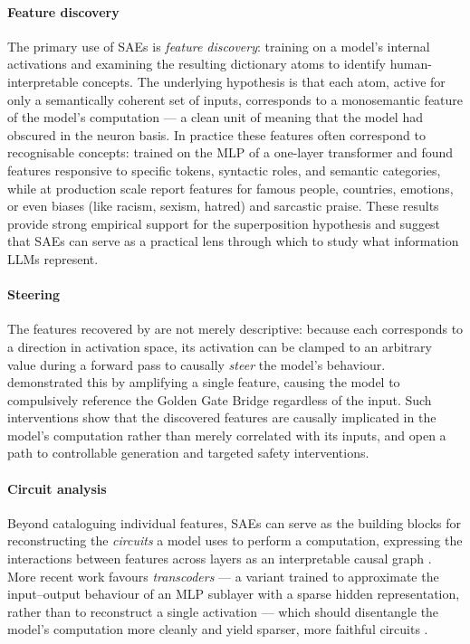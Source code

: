     \paragraph{Feature discovery} The primary use of \acp{SAE} is
    \textit{feature discovery}: training  on a model's internal
    activations and examining the resulting dictionary atoms to identify
    human-interpretable concepts. The underlying hypothesis is that each atom,
    active for only a semantically coherent set of inputs, corresponds to a
    monosemantic feature of the model's computation --- a clean unit of meaning
    that the model had obscured in the neuron basis. In practice these features
    often correspond to recognisable concepts:
    \citet{brickenMonosemanticityDecomposingLanguage2023} trained  on
    the \ac{MLP} of a one-layer transformer and found features responsive to
    specific tokens, syntactic roles, and semantic categories, while at
    production scale \citet{templetonScalingMonosemanticityExtracting} report
    features for famous people, countries, emotions, or even biases (like
    racism, sexism, hatred) and sarcastic praise. These results provide strong
    empirical support for the superposition hypothesis and suggest that
    \acp{SAE} can serve as a practical lens through which to study what
    information \acp{LLM} represent.

    \paragraph{Steering} The features recovered by  are not merely
    descriptive: because each corresponds to a direction in activation space,
    its activation can be clamped to an arbitrary value during a forward pass to
    causally \textit{steer} the model's behaviour.
    \citet{templetonScalingMonosemanticityExtracting} demonstrated this by
    amplifying a single feature, causing the model to compulsively reference the
    Golden Gate Bridge regardless of the input. Such interventions show that the
    discovered features are causally implicated in the model's computation
    rather than merely correlated with its inputs, and open a path to
    controllable generation and targeted safety interventions.

    \paragraph{Circuit analysis} Beyond cataloguing individual features,
    \acp{SAE} can serve as the building blocks for reconstructing the
    \textit{circuits} a model uses to perform a computation, expressing the
    interactions between features across layers as an interpretable causal graph
    \cite{marksSparseFeatureCircuits2025}. More recent work favours
    \textit{transcoders} --- a variant trained to approximate the input--output
    behaviour of an \ac{MLP} sublayer with a sparse hidden representation,
    rather than to reconstruct a single activation --- which should disentangle
    the model's computation more cleanly and yield sparser, more faithful
    circuits \cite{dunefskyTranscodersFindInterpretable2024,
    ameisenCircuitTracingRevealing2025}.

